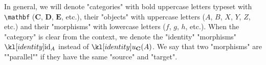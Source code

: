 \documentclass[main.tex]{subfiles}
\begin{document}
\begin{rem}[Notation]
	In general, we will denote "categories" with bold uppercase letters typeset with \verb!\mathbf! ($\mathbf{C}$, $\mathbf{D}$, $\mathbf{E}$, etc.), their "objects" with uppercase letters ($A$, $B$, $X$, $Y$, $Z$, etc.) and their "morphisms" with lowercase letters ($f$, $g$, $h$, etc.). When the "category" is clear from the context, we denote the "identity" "morphisms" $\id_A$ instead of $\idu_{\mathbf{C}}(A)$. \AP We say that two "morphisms" are ""parallel"" if they have the same "source" and "target".
\end{rem}
\end{document}
